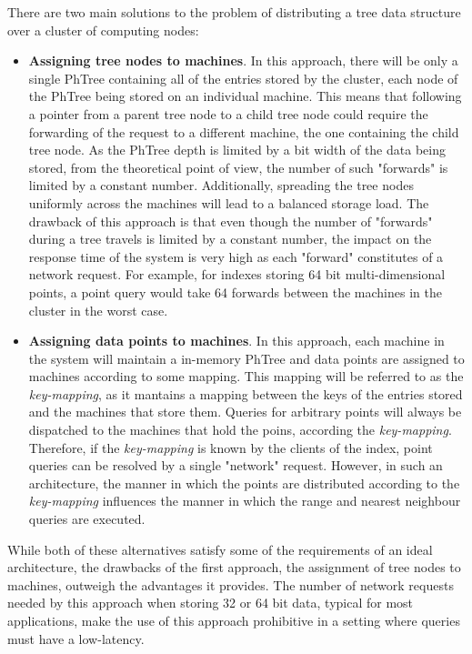 \documentclass[11pt,a4paper]{globis-book}
\begin{document}
There are two main solutions to the problem of distributing a tree data structure over a cluster of computing nodes: 
\begin{itemize}
    \item \textbf{Assigning tree nodes to machines}. In this approach, there will be only a single PhTree containing all of the entries stored by the cluster, each node of the PhTree being stored on an individual machine. This means that following a pointer from a parent tree node to a child tree node could require the forwarding of the request to a different machine, the one containing the child tree node. As the PhTree depth is limited by a bit width of the data being stored, from the theoretical point of view, the number of such "forwards" is limited by a constant number. Additionally, spreading the tree nodes uniformly across the machines will lead to a balanced storage load. The drawback of this approach is that even though the number of "forwards" during a tree travels is limited by a constant number, the impact on the response time of the system is very high as each "forward" constitutes of a network request. For example, for indexes storing 64 bit multi-dimensional points, a point query would take 64 forwards between the machines in the cluster in the worst case.  
    \item \textbf{Assigning data points to machines}. In this approach, each machine in the system will maintain a in-memory PhTree and data points are assigned to machines according to some mapping. This mapping will be referred to as the \textit{key-mapping}, as it mantains a mapping between the keys of the entries stored and the machines that store them. Queries for arbitrary points will always be dispatched to the machines that hold the poins, according the \textit{key-mapping}. Therefore, if the \textit{key-mapping} is known by the clients of the index, point queries can be resolved by a single "network" request. However, in such an architecture, the manner in which the points are distributed according to the \textit{key-mapping} influences the manner in which the range and nearest neighbour queries are executed. 
\end{itemize}

While both of these alternatives satisfy some of the requirements of an ideal architecture, the drawbacks of the first approach, the assignment of tree nodes to machines, outweigh the advantages it provides. The number of network requests needed by this approach when storing 32 or 64 bit data, typical for most applications, make the use of this approach prohibitive in a setting where queries must have a low-latency.
\end{document}
